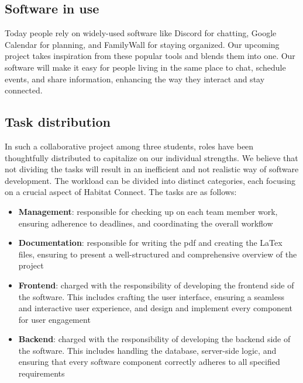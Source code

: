 \documentclass[conference]{IEEEtran}
\begin{document}
\subsection{Software in use}
Today people rely on widely-used software like Discord for chatting, Google Calendar for planning, and FamilyWall for staying organized. Our upcoming project takes inspiration from these popular tools and blends them into one. Our software will make it easy for people living in the same place to chat, schedule events, and share information, enhancing the way they interact and stay connected.
\subsection{Task distribution}
In such a collaborative project among three students, roles have been thoughtfully distributed to capitalize on our individual strengths. We believe that not dividing the tasks will result in an inefficient and not realistic way of software development. The workload can be divided into distinct categories, each focusing on a crucial aspect of Habitat Connect. The tasks are as follows:
\begin{itemize}
    \item \textbf{Management}: responsible for checking up on each team member work, ensuring adherence to deadlines, and coordinating the overall workflow
    \item \textbf{Documentation}: responsible for writing the pdf and creating the LaTex files, ensuring to present a well-structured and comprehensive overview of the project
    \item \textbf{Frontend}: charged with the responsibility of developing the frontend side of the software. This includes crafting the user interface, ensuring a seamless and interactive user experience, and design and implement every component for user engagement
    \item \textbf{Backend}: charged with the responsibility of developing the backend side of the software. This includes handling the database, server-side logic, and ensuring that every software component correctly adheres to all specified requirements 
\end{itemize}
\end{document}
